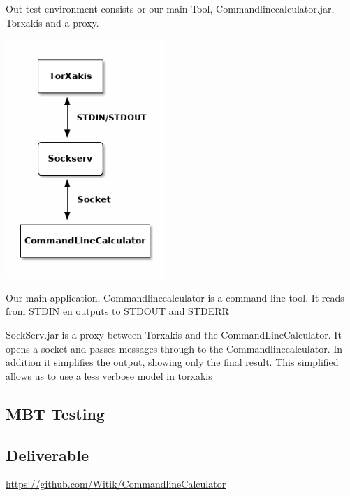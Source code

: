 \documentclass[11pt,a4paper]{article}
\begin{document}
Out test environment consists or our main Tool,
Commandlinecalculator.jar, Torxakis and a proxy.

\includegraphics[width=6cm]{overview.png}

Our main application, Commandlinecalculator is a command line tool. It
reads from STDIN en outputs to STDOUT and STDERR

SockServ.jar is a proxy between Torxakis and the
CommandLineCalculator. It opens a socket and passes messages through
to the Commandlinecalculator. In addition it simplifies the output,
showing only the final result. This simplified allows us to use a less
verbose model in torxakis

\subsection{MBT Testing}

\subsection{Deliverable}

\url{https://github.com/Witik/CommandlineCalculator}
\end{document}
